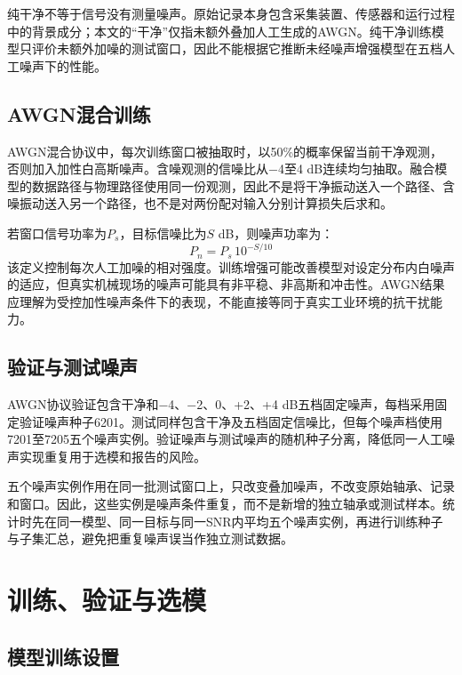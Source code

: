 \documentclass[UTF8,12pt,openany,twoside]{ctexbook}
\numberwithin{equation}{chapter}
\begin{document}
纯干净不等于信号没有测量噪声。原始记录本身包含采集装置、传感器和运行过程中的背景成分；本文的``干净''仅指未额外叠加人工生成的AWGN。纯干净训练模型只评价未额外加噪的测试窗口，因此不能根据它推断未经噪声增强模型在五档人工噪声下的性能。

\subsection{AWGN混合训练}\label{awgnux6df7ux5408ux8badux7ec3}

AWGN混合协议中，每次训练窗口被抽取时，以50\%的概率保留当前干净观测，否则加入加性白高斯噪声。含噪观测的信噪比从−4至4 dB连续均匀抽取。融合模型的数据路径与物理路径使用同一份观测，因此不是将干净振动送入一个路径、含噪振动送入另一个路径，也不是对两份配对输入分别计算损失后求和。

若窗口信号功率为$P_s$，目标信噪比为$S$ dB，则噪声功率为：
\begin{equation}
\label{eq:auto14}
P_n=P_s\,10^{-S/10}
\end{equation}该定义控制每次人工加噪的相对强度。训练增强可能改善模型对设定分布内白噪声的适应，但真实机械现场的噪声可能具有非平稳、非高斯和冲击性。AWGN结果应理解为受控加性噪声条件下的表现，不能直接等同于真实工业环境的抗干扰能力。

\subsection{验证与测试噪声}\label{ux9a8cux8bc1ux4e0eux6d4bux8bd5ux566aux58f0}

AWGN协议验证包含干净和−4、−2、0、+2、+4 dB五档固定噪声，每档采用固定验证噪声种子6201。测试同样包含干净及五档固定信噪比，但每个噪声档使用7201至7205五个噪声实例。验证噪声与测试噪声的随机种子分离，降低同一人工噪声实现重复用于选模和报告的风险。

五个噪声实例作用在同一批测试窗口上，只改变叠加噪声，不改变原始轴承、记录和窗口。因此，这些实例是噪声条件重复，而不是新增的独立轴承或测试样本。统计时先在同一模型、同一目标与同一SNR内平均五个噪声实例，再进行训练种子与子集汇总，避免把重复噪声误当作独立测试数据。

\section{训练、验证与选模}\label{ux8badux7ec3ux9a8cux8bc1ux4e0eux9009ux6a21}

\subsection{模型训练设置}\label{ux6a21ux578bux8badux7ec3ux8bbeux7f6e}
\end{document}
